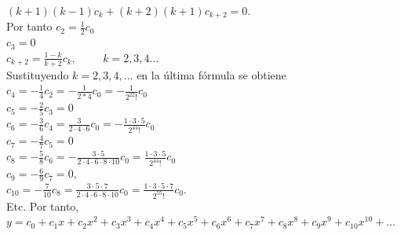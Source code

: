 \documentclass[12pt,letterpaper,oneside]{article}
\begin{document}
\hspace*{3cm} $(k+1)(k-1) c_k + (k + 2) (k + 1)c_{k+2} = 0.$\vspace{0.3cm}\\
Por tanto \hspace{2.5cm} $c_2 = \frac{1}{2} c_0$\vspace{0.3cm}\\
\hspace*{4.4cm} $c_3 = 0$\vspace{0.3cm}\\
\hspace*{4.4cm} $c_{k+2} = \frac{1 - k}{k + 2}c_k,\hspace{1cm} k=2,3,4...$\vspace{0.3cm}\\
Sustituyendo $k = 2,3,4,...$ en la última fórmula se obtiene\\
\hspace*{3.5cm} $c_4 = - \frac{1}{4} c_2 = - \frac{1}{2*4}c_0 = - \frac{1}{2^22!} c_0$\vspace{0.3cm}\\
\hspace*{3.5cm} $c_5 = - \frac{2}{5} c_3 = 0$\vspace{0.3cm}\\
\hspace*{3.5cm} $c_6 = - \frac{3}{6} c_4 = \frac{3}{2\cdot 4 \cdot 6} c_0 = - \frac{1\cdot3\cdot5}{2^44!} c_0$\vspace{0.3cm}\\
\hspace*{3.5cm} $ c_7 = - \frac{4}{7} c_5 =0$ \vspace{0.3cm}\\
\hspace*{3.5cm} $c_8 = - \frac{5}{8} c_6 = - \frac{3\cdot5}{2\cdot4\cdot6\cdot8\cdot10} c_0 = \frac{1\cdot3\cdot5}{2^44!}c_0$ \vspace{0.3cm}\\
\hspace*{3.5cm} $c_9 = - \frac{6}{9} c_7 = 0$, \vspace{0.3cm}\\
\hspace*{3.5cm} $c_{10} = - \frac{7}{10} c_8 = \frac{3\cdot5\cdot7}{2\cdot4\cdot6\cdot8\cdot10} c_0 = \frac{1\cdot3\cdot5\cdot7}{2^55!} c_0.$ \vspace{0.3cm}\\
Etc. Por tanto,\\
$y = c_0 + c_1x + c_2x^2 + c_3x^3 + c_4x^4 + c_5x^5 + c_6x^6 + c_7x^7 + c_8x^8 + c_9x^9 + c_{10}x^{10} + ...$\vspace{0.3cm}\\ 
\end{document}
